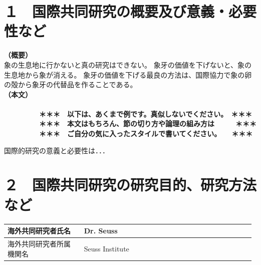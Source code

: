 \documentclass[11pt,a4j,dvipdfmx]{jarticle} 					%
\newcommand{\研究課題名}{象の卵}
\newcommand{\研究機関名}{逢坂大学}
\newcommand{\研究代表者氏名}{湯川秀樹}
\newcommand{\研究期間の最終元号年度}{11}  %
\begin{document}

\section{１　国際共同研究の概要及び意義・必要性など}

\JSPSInstructions		%
\noindent
\textbf{（概要）}\\
	象の生息地に行かないと真の研究はできない。
	象牙の価値を下げないと、象の生息地から象が消える。
	象牙の価値を下げる最良の方法は、国際協力で象の卵の殻から象牙の代替品を作ることである。
\\

\noindent
\textbf{（本文）}\\
\textbf{\\　　　　　＊＊＊　以下は、あくまで例です。真似しないでください。　＊＊＊\\
　　　　　＊＊＊　本文はもちろん、節の切り方や論理の組み方は　　　＊＊＊\\
　　　　　＊＊＊　ご自分の気に入ったスタイルで書いてください。　　＊＊＊}

	国際的研究の意義と必要性は．．．




\section{２　国際共同研究の研究目的、研究方法など}

	\noindent
	\begin{tabular}{|p{0.3\linewidth}|p{0.677\linewidth}|}
		\hline
		海外共同研究者氏名 & Dr. Seuss\\
		\hline
		海外共同研究者所属機関名 & Seuss Institute\\
		\hline
	\end{tabular}
\end{document}
